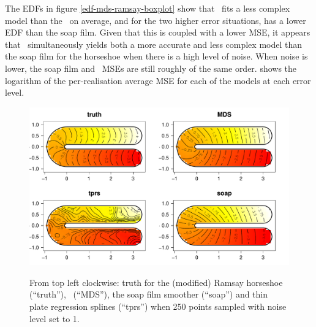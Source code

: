 The EDFs in figure \ref{edf-mds-ramsay-boxplot} show that \mdsap\ fits a less complex model than the \tprs\ on average, and for the two higher error situations, has a lower EDF than the soap film. Given that this is coupled with a lower MSE, it appears that \mdsap\ simultaneously yields both a more accurate and less complex model than the soap film for the horseshoe when there is a high level of noise. When noise is lower, the soap film and \mdsap\ MSEs are still roughly of the same order.  shows the logarithm of the per-realisation average MSE for each of the models at each error level.

\begin{figure}
\centering
\includegraphics[width=6in]{mds/figs/ramsay-fit-1.pdf} \\
\caption{From top left clockwise: truth for the (modified) Ramsay horseshoe (``truth''), \mdsap\ (``MDS''), the soap film smoother (``soap'') and thin plate regression splines (``tprs'') when 250 points sampled with noise level set to 1.\label{cor-4s4}}
\label{mds-ramsay-fit-1}
\end{figure}

